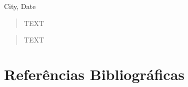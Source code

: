 \documentclass[a4paper,12pt]{article}
\begin{document}
\vspace{1 cm}
\begin{center}
City, Date
\end{center}

\clearpage
{}
\setlength{\parskip}{0mm}


\onehalfspacing
    
\begin{abstract}
	\noindent TEXT
\end{abstract}


\begin{abstract}
	\noindent TEXT

\end{abstract}


\newpage
\setlength{\parskip}{3mm}
\doublespacing

\let\clearpage\relax














\newpage
\renewcommand\refname{\vskip -2cm}
\section*{Referências Bibliográficas}

\newpage
\newpage

\end{document}
